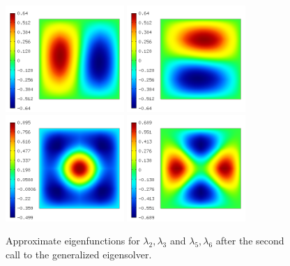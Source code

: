\documentclass[preprint ,12pt]{elsarticle}
\begin{document}
\begin{figure}[!ht]
\begin{center}
\includegraphics[width=0.4\textwidth]{img/eigen_5.png}
\includegraphics[width=0.4\textwidth]{img/eigen_6.png}\\
\includegraphics[width=0.4\textwidth]{img/eigen_7.png}
\includegraphics[width=0.4\textwidth]{img/eigen_8.png}\\
\end{center}
\vspace{-5mm}
\caption{Approximate eigenfunctions for $\lambda_2, \lambda_3$ and 
$\lambda_5, \lambda_6$ after the second call to the generalized eigensolver.}
\label{fig:eigen2}
\end{figure}
\end{document}
